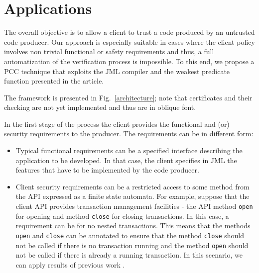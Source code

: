 \section{Applications}
\label{architecture_s}	


The overall objective is to allow a client to trust a code produced by an untrusted code producer. Our approach is especially suitable
 in cases where the client policy involves non trivial functional or safety requirements and thus, a full automatization of the verification 
process is impossible. To this end, we propose a PCC technique that exploits the JML compiler and the weakest predicate function presented in the article. 
 
 The framework is presented in Fig.~\ref{architecture}; note that certificates and their checking are not yet implemented
 and thus are in oblique font.
  

\begin{figure*}[!tbp]
\centering
{}    
\caption{\sc The overall architecture for client producer scenarios }
\label{architecture}
\end{figure*}





In the first stage of the process the client provides the functional and (or) security requirements to the producer.
 The requirements can be in different form:
\begin{itemize}
\item Typical functional requirements can be a specified interface describing the application to be developed. 
In that case, the client specifies in JML the features that have to be implemented by the code producer.
\item Client security requirements can be a restricted access to some method from the API expressed as a finite state automata.
For example, suppose that the client API provides transaction management facilities - the API method \texttt{open} for opening and method 
\texttt{close} for closing transactions. In this case, a requirement can be for no nested transactions.
This means that the methods \texttt{open} and \texttt{close} can be annotated to ensure that the method \texttt{close} 
 should not be called if there is no transaction running and the method \texttt{open} should not be called if there is already a running transaction. 
In this scenario, we can apply results of previous work \cite{PBBHL}.  
\end{itemize}

